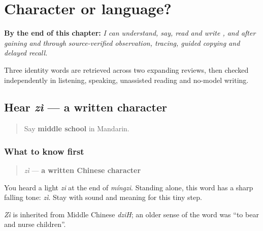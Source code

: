 
\chapter{Character or language?}
\label{ch:zh-language-identity}

\begin{chapteropening}
\textbf{By the end of this chapter:} \emph{I can understand, say, read and write ,  and  after gaining  and  through source-verified observation, tracing, guided copying and delayed recall.}

Three identity words are retrieved across two expanding reviews, then checked independently in listening, speaking, unassisted reading and no-model writing.
\end{chapteropening}

\section[zì]{Hear \emph{zì} — a written character}

\label{lesson:ZH-C16-hear-zi}



\begin{quote}
Say \textbf{middle school} in Mandarin.
\end{quote}

\subsection*{What to know first}
\begin{quote}
\emph{zì} — \textbf{a written Chinese character}
\end{quote}

You heard a light \emph{zi} at the end of \emph{míngzi}. Standing alone, this word has a sharp falling tone: \emph{zì}. Stay with sound and meaning for this tiny step.

\emph{Zì} is inherited from Middle Chinese \emph{dziH}; an older sense of the word was \textquotedblleft{}to bear and nurse children\textquotedblright{}.

